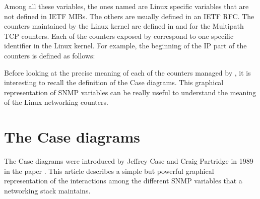 \documentclass[letterpaper,10pt,english]{sphinxmanual}
\begin{document}
\sphinxAtStartPar
Among all these variables, the ones named  are Linux specific
variables that are not defined in IETF MIBs. The others are usually defined
in an IETF RFC. The counters maintained by the Linux kernel are defined in
 and
 for the Multipath TCP counters.
Each of the counters exposed by  correspond to one specific identifier
in the Linux kernel. For example, the beginning of the IP part of the
counters is defined as follows:

\begin{sphinxVerbatim}[commandchars=\\\{\}]
\end{sphinxVerbatim}

\sphinxAtStartPar
Before looking at the precise meaning of each of the counters managed by
,
it is interesting to recall the definition of the Case diagrams. This graphical
representation of SNMP variables can be really useful to understand the
meaning of the Linux networking counters.


\section{The Case diagrams}
\label{\detokenize{nstat-intro:the-case-diagrams}}
\sphinxAtStartPar
The Case diagrams were introduced by Jeffrey Case and Craig
Partridge in 1989 in the paper .
This article describes a simple but powerful graphical representation
of the interactions among the different SNMP variables that a networking
stack maintains.
\end{document}
